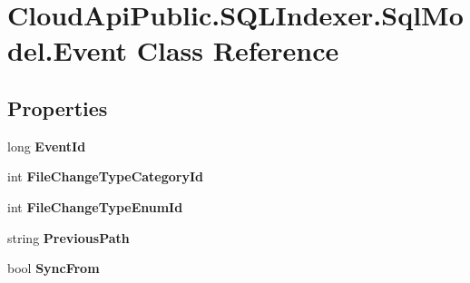 \hypertarget{class_cloud_api_public_1_1_s_q_l_indexer_1_1_sql_model_1_1_event}{\section{Cloud\-Api\-Public.\-S\-Q\-L\-Indexer.\-Sql\-Model.\-Event Class Reference}
\label{class_cloud_api_public_1_1_s_q_l_indexer_1_1_sql_model_1_1_event}
}
\subsection*{Properties}
\begin{DoxyCompactItemize}
\item 
\hypertarget{class_cloud_api_public_1_1_s_q_l_indexer_1_1_sql_model_1_1_event_a0329cac18b366666adfe68cdb6f110d1}{long {\bfseries Event\-Id}}\label{class_cloud_api_public_1_1_s_q_l_indexer_1_1_sql_model_1_1_event_a0329cac18b366666adfe68cdb6f110d1}

\item 
\hypertarget{class_cloud_api_public_1_1_s_q_l_indexer_1_1_sql_model_1_1_event_aec1b113388617f1ed4d73eaac7f836b0}{int {\bfseries File\-Change\-Type\-Category\-Id}}\label{class_cloud_api_public_1_1_s_q_l_indexer_1_1_sql_model_1_1_event_aec1b113388617f1ed4d73eaac7f836b0}

\item 
\hypertarget{class_cloud_api_public_1_1_s_q_l_indexer_1_1_sql_model_1_1_event_a3adccf26e694cb3043ab2a0f717ba12d}{int {\bfseries File\-Change\-Type\-Enum\-Id}}\label{class_cloud_api_public_1_1_s_q_l_indexer_1_1_sql_model_1_1_event_a3adccf26e694cb3043ab2a0f717ba12d}

\item 
\hypertarget{class_cloud_api_public_1_1_s_q_l_indexer_1_1_sql_model_1_1_event_a75a9feb8a57d7d8ad2e2e5cc93f6bf8a}{string {\bfseries Previous\-Path}}\label{class_cloud_api_public_1_1_s_q_l_indexer_1_1_sql_model_1_1_event_a75a9feb8a57d7d8ad2e2e5cc93f6bf8a}

\item 
\hypertarget{class_cloud_api_public_1_1_s_q_l_indexer_1_1_sql_model_1_1_event_afb932d110f06b76e2759408c49863082}{bool {\bfseries Sync\-From}}\label{class_cloud_api_public_1_1_s_q_l_indexer_1_1_sql_model_1_1_event_afb932d110f06b76e2759408c49863082}


\end{DoxyCompactItemize}
